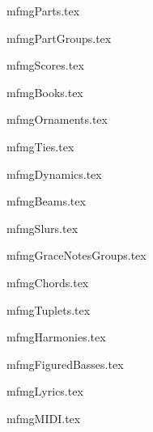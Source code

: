 {mfmgParts.tex}

{mfmgPartGroups.tex}

{mfmgScores.tex}

{mfmgBooks.tex}

{mfmgOrnaments.tex}

{mfmgTies.tex}

{mfmgDynamics.tex}

{mfmgBeams.tex}

{mfmgSlurs.tex}

{mfmgGraceNotesGroups.tex}

{mfmgChords.tex}

{mfmgTuplets.tex}

{mfmgHarmonies.tex}

{mfmgFiguredBasses.tex}

{mfmgLyrics.tex}

{mfmgMIDI.tex}

